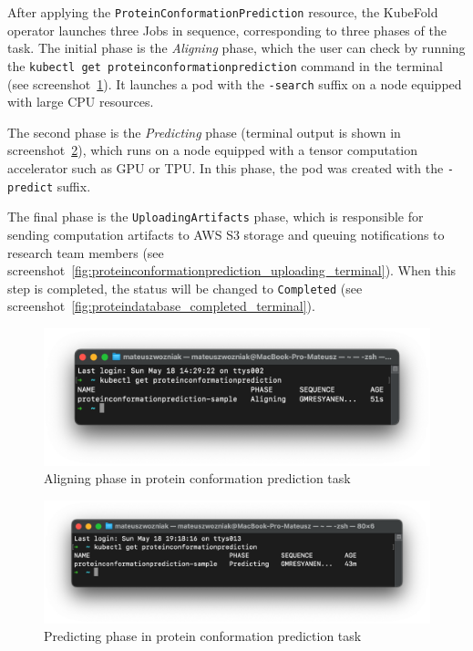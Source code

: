 After applying the \texttt{ProteinConformationPrediction} resource, the KubeFold operator launches three Jobs in sequence, corresponding to three phases of the task.
The initial phase is the \textit{Aligning} phase, which the user can check by running the \texttt{kubectl get proteinconformationprediction} command in the terminal (see screenshot~\ref{fig:proteinconformationprediction_aligning_terminal}). It launches a pod with the \texttt{-search} suffix on a node equipped with large CPU resources.

The second phase is the \textit{Predicting} phase (terminal output is shown in screenshot~\ref{fig:proteinconformationprediction_predicting_terminal}), which runs on a node equipped with a tensor computation accelerator such as GPU or TPU.
In this phase, the pod was created with the \texttt{-predict} suffix.

The final phase is the \texttt{UploadingArtifacts} phase, which is responsible for sending computation artifacts to AWS S3 storage and queuing notifications to research team members (see screenshot~\ref{fig:proteinconformationprediction_uploading_terminal}). When this step is completed, the status will be changed to \texttt{Completed} (see screenshot~\ref{fig:proteindatabase_completed_terminal}).

\begin{figure}[htbp]
    \centering
    \includegraphics[width=\textwidth]{images/proteinconformationprediction_aligning_terminal}
    \caption{Aligning phase in protein conformation prediction task}
    \label{fig:proteinconformationprediction_aligning_terminal}
\end{figure}

\begin{figure}[htbp]
    \centering
    \includegraphics[width=\textwidth]{images/proteinconformationprediction_predicting_terminal}
    \caption{Predicting phase in protein conformation prediction task}
    \label{fig:proteinconformationprediction_predicting_terminal}
\end{figure}

